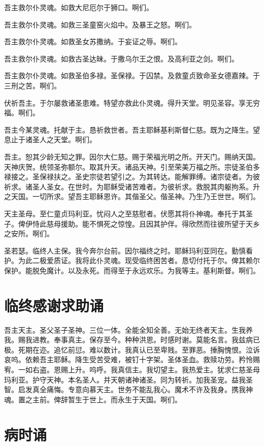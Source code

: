 \documentclass[UTF8,17pt]{ctexart}
\begin{document}
吾主救尔仆灵魂。如救⼤尼厄尔于狮口。啊们。

吾主救尔仆灵魂。如救三圣童窑⽕焰中。及暴王之怒。啊们。

吾主救尔仆灵魂。如救圣⼥苏撒纳。于妄证之辱。啊们。

吾主救尔仆灵魂。如救古圣达昧。于撒乌尔王之恨。及⾼利亚之剑。啊们。

吾主救尔仆灵魂。如救圣伯多禄。圣保禄。于囚禁。及救童贞致命圣⼥德嘉辣。于三刑之苦。啊们。

伏祈吾主。于尔屡救诸圣患难。特望亦救此仆灵魂。得升天堂。明见圣容。享⽆穷福。啊们。

吾主今某灵魂。托献于主。恳祈救世者。吾主耶稣基利斯督仁慈。既为之降⽣。望息⽌于诸圣⼈之天堂。啊们。

吾主。恕其少龄⽆知之罪。因尔⼤仁慈。赐于荣福光明之所。开天门。赐纳天国。天神庆贺。统领圣弥额尔。取其升天。诸品天神。引⾄荣美万福之所。宗徒圣伯多禄接之。圣保禄扶之。圣史宗徒若望引之。为其转达。能解罪缚。诸宗徒者。为彼祈求。诸圣⼈圣⼥。在世时。为耶稣受诸苦难者。为彼祈求。救脱其⾁躯拘系。升之天国。⼀切所求。望吾主耶稣恩许。其偕圣⽗。偕圣神。乃⽣乃王世世。啊们。

天主圣母。⾄仁童贞玛利亚。忧闷⼈之⾄慈慰者。伏愿其将仆神魂。奉托于其圣⼦。俾伊恃此慈母援助。能不惧死之惊惶。且因其护伴。得欣然⽽往彼所望于天乡之安所。啊们。

圣若瑟。临终⼈主保。我今奔尔台前。因尔福终之时。耶稣玛利亚同在。勤慎看护。为此⼆极爱质证。我将此仆灵魂。现受临终困苦者。恳切付托于尔。俾其赖尔保护。能脱免魔计。以及永死。⽽得⾄于永远欢乐。为我等主。基利斯督。啊们。

\section{临终感谢求助诵}

吾主天主。圣⽗圣⼦圣神。三位⼀体。全能全知全善。⽆始⽆终者天主。⽣我养我。赐我进教。奉事真主。保存⾄今。种种洪恩。时感时谢。莫能名⾔。我兹病已极。死期在迩。追忆前愆。难以数计。我真认已⾄卑贱。⾄罪恶。捶胸愧恨。泣诉哀呜。依赖吾主耶稣。降⽣受苦受难，被钉⼗字架。圣体圣⾎。救赎功劳。矜怜赐宥。⼀如右盗。恩赐上升。呜呼。我真信主。我切望主。我热爱主。犹求仁慈圣母玛利亚。护守天神。本名圣⼈。并天朝诸神诸圣。同为转祈。加我圣宠。益我圣智。启发真全痛悔。专意向慕天主。世务不能乱我⼼。魔术不许及我⾝。携我神魂。置之主前。俾辞暂⽣于世上。⽽永⽣于天国。啊们。

\section{病时诵}
\end{document}
